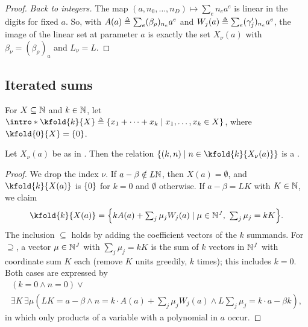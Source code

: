 \begin{proof}
    \emph{Back to integers.}
    The map $(a, n_0, \dots, n_D) \mapsto \sum_e n_e a^{e}$ is linear in the digits for fixed $a$.
    So, with $A(a) \defeq \sum_e (\beta_\rho)_{n_e} a^{e}$ and $W_j(a) \defeq \sum_e (\gamma'_j)_{n_e} a^{e}$, the image of the linear set at parameter $a$ is exactly the set $X_\nu(a)$ with $\beta_\nu = (\beta_{\rho})_a$ and $L_\nu = L$.
\end{proof}

\subsection{Iterated sums}
For $X \subseteq \mathbb{N}$ and $k \in \mathbb{N}$, let $\intro*\kfold{k}{X} \defeq \set{x_1 + \dots + x_k \mid x_1, \dots, x_k \in X}$, where $\kfold{0}{X} = \set{0}$.
\begin{lemma}\label{lemma: iterated sums}
    Let $X_\nu(a)$ be as in .
    Then the relation $\set{(k, n) \mid n \in \kfold{k}{X_\nu(a)}}$ is a .
\end{lemma}
\begin{proof}
    We drop the index $\nu$.
    If $a - \beta \notin L \mathbb{N}$, then $X(a) = \emptyset$, and $\kfold{k}{X(a)}$ is $\{0\}$ for $k = 0$ and $\emptyset$ otherwise.
    If $a - \beta = L K$ with $K \in \mathbb{N}$, we claim
    \[\kfold{k}{X(a)} = \set*{\textstyle k A(a) + \sum_{j} \mu_j W_j(a) \mid \mu \in \nat^{J},\ \sum_{j} \mu_j = k K}.\]
    The inclusion $\subseteq$ holds by adding the coefficient vectors of the $k$ summands.
    For $\supseteq$, a vector $\mu \in \mathbb{N}^{J}$ with $\sum_j \mu_j = k K$ is the sum of $k$ vectors in $\mathbb{N}^{J}$ with coordinate sum $K$ each (remove $K$ units greedily, $k$ times); this includes $k = 0$.
    Both cases are expressed by
    \begin{multline*}
        (k = 0 \land n = 0) \lor {} \\
        \exists K\, \exists \mu \left(L K = a - \beta \land n = k \cdot A(a) + \textstyle\sum_{j} \mu_j W_j(a) \land L \sum_j \mu_j = k \cdot a - \beta k\right),
    \end{multline*}
    in which only products of a variable with a polynomial in $a$ occur.
\end{proof}

